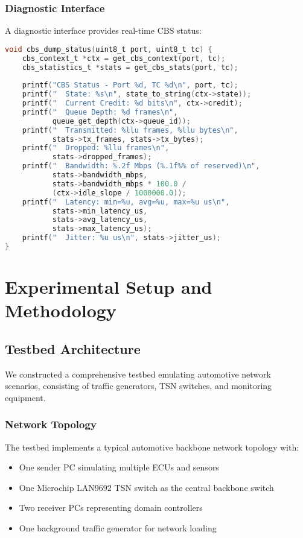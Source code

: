 \documentclass[10pt, journal, compsoc]{IEEEtran}
\begin{document}
\subsubsection{Diagnostic Interface}

A diagnostic interface provides real-time CBS status:

\begin{lstlisting}[language=C, caption=Diagnostic Output]
void cbs_dump_status(uint8_t port, uint8_t tc) {
    cbs_context_t *ctx = get_cbs_context(port, tc);
    cbs_statistics_t *stats = get_cbs_stats(port, tc);
    
    printf("CBS Status - Port %d, TC %d\n", port, tc);
    printf("  State: %s\n", state_to_string(ctx->state));
    printf("  Current Credit: %d bits\n", ctx->credit);
    printf("  Queue Depth: %d frames\n", 
           queue_get_depth(ctx->queue_id));
    printf("  Transmitted: %llu frames, %llu bytes\n",
           stats->tx_frames, stats->tx_bytes);
    printf("  Dropped: %llu frames\n", 
           stats->dropped_frames);
    printf("  Bandwidth: %.2f Mbps (%.1f%% of reserved)\n",
           stats->bandwidth_mbps,
           stats->bandwidth_mbps * 100.0 / 
           (ctx->idle_slope / 1000000.0));
    printf("  Latency: min=%u, avg=%u, max=%u us\n",
           stats->min_latency_us,
           stats->avg_latency_us,
           stats->max_latency_us);
    printf("  Jitter: %u us\n", stats->jitter_us);
}
\end{lstlisting}

\section{Experimental Setup and Methodology}
\label{sec:experimental_setup}

\subsection{Testbed Architecture}

We constructed a comprehensive testbed emulating automotive network scenarios, consisting of traffic generators, TSN switches, and monitoring equipment.

\subsubsection{Network Topology}

The testbed implements a typical automotive backbone network topology with:
\begin{itemize}
    \item One sender PC simulating multiple ECUs and sensors
    \item One Microchip LAN9692 TSN switch as the central backbone switch
    \item Two receiver PCs representing domain controllers
    \item One background traffic generator for network loading
\end{itemize}
\end{document}
